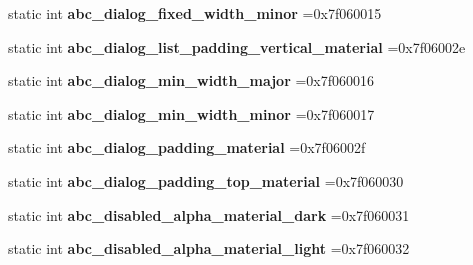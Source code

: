 \begin{DoxyCompactItemize}
static int {\bfseries abc\+\_\+dialog\+\_\+fixed\+\_\+width\+\_\+minor} =0x7f060015
\item 
\mbox{\label{classandroid_1_1support_1_1v7_1_1mediarouter_1_1R_1_1dimen_a2e275f5ce9bea86628129f34a16943e2}} 
static int {\bfseries abc\+\_\+dialog\+\_\+list\+\_\+padding\+\_\+vertical\+\_\+material} =0x7f06002e
\item 
\mbox{\label{classandroid_1_1support_1_1v7_1_1mediarouter_1_1R_1_1dimen_a50a48d44b0db7dce316b6af345b56007}} 
static int {\bfseries abc\+\_\+dialog\+\_\+min\+\_\+width\+\_\+major} =0x7f060016
\item 
\mbox{\label{classandroid_1_1support_1_1v7_1_1mediarouter_1_1R_1_1dimen_abfff971be06730c3f0c87ccbc5503f33}} 
static int {\bfseries abc\+\_\+dialog\+\_\+min\+\_\+width\+\_\+minor} =0x7f060017
\item 
\mbox{\label{classandroid_1_1support_1_1v7_1_1mediarouter_1_1R_1_1dimen_ab4f91e53307d3c6ab89cc93f4a340274}} 
static int {\bfseries abc\+\_\+dialog\+\_\+padding\+\_\+material} =0x7f06002f
\item 
\mbox{\label{classandroid_1_1support_1_1v7_1_1mediarouter_1_1R_1_1dimen_a0879a78ab97bb2d7399fa6b6baade9da}} 
static int {\bfseries abc\+\_\+dialog\+\_\+padding\+\_\+top\+\_\+material} =0x7f060030
\item 
\mbox{\label{classandroid_1_1support_1_1v7_1_1mediarouter_1_1R_1_1dimen_a3af723d8d41f63010f0aef5a88c6ea10}} 
static int {\bfseries abc\+\_\+disabled\+\_\+alpha\+\_\+material\+\_\+dark} =0x7f060031
\item 
\mbox{\label{classandroid_1_1support_1_1v7_1_1mediarouter_1_1R_1_1dimen_ab61238278f072a4a80af9aaf062d6844}} 
static int {\bfseries abc\+\_\+disabled\+\_\+alpha\+\_\+material\+\_\+light} =0x7f060032
\item 
\mbox{\label{classandroid_1_1support_1_1v7_1_1mediarouter_1_1R_1_1dimen_a47a31abd7307f392d982e06895f9acc3}} 

\end{DoxyCompactItemize}
